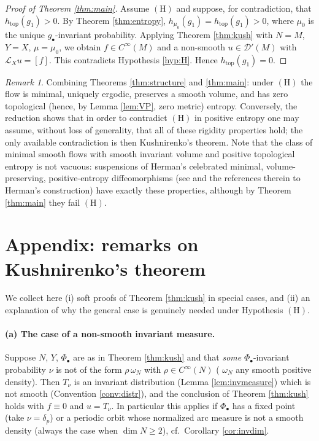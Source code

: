 \documentclass[11pt]{amsart}
\theoremstyle{plain}
\theoremstyle{definition}
\theoremstyle{remark}
\newtheorem{remark}[theorem]{Remark}
\newcommand{\Dp}{\mathcal{D}'}
\newcommand{\Lx}{\mathcal{L}_X}
\begin{document}
\begin{proof}[Proof of Theorem \emph{\ref{thm:main}}]
Assume $(\mathrm{H})$ and suppose, for contradiction, that
$h_{\mathrm{top}}(g_1)>0$. By Theorem \ref{thm:entropy},
$h_{\mu_0}(g_1)=h_{\mathrm{top}}(g_1)>0$, where $\mu_0$ is the unique
$g_\bullet$-invariant probability. Applying Theorem \ref{thm:kush} with
$N=M$, $Y=X$, $\mu=\mu_0$, we obtain $f\in C^\infty(M)$ and a
non-smooth $u\in\Dp(M)$ with $\Lx u=[f]$. This contradicts Hypothesis
\ref{hyp:H}. Hence $h_{\mathrm{top}}(g_1)=0$.
\end{proof}

\begin{remark}
Combining Theorems \ref{thm:structure} and \ref{thm:main}: under
$(\mathrm{H})$ the flow is minimal, uniquely ergodic, preserves a smooth
volume, and has zero topological (hence, by Lemma \ref{lem:VP}, zero
metric) entropy. Conversely, the reduction shows that in order to
contradict $(\mathrm{H})$ in positive entropy one may assume, without
loss of generality, that all of these rigidity properties hold; the only
available contradiction is then Kushnirenko's theorem. Note that the
class of minimal smooth flows with smooth invariant volume and positive
topological entropy is not vacuous: suspensions of Herman's celebrated
minimal, volume-preserving, positive-entropy diffeomorphisms (see
\cite{LWW} and the references therein to Herman's construction) have
exactly these properties, although by Theorem \ref{thm:main} they fail
$(\mathrm{H})$.
\end{remark}

\section{Appendix: remarks on Kushnirenko's theorem}\label{app:kush}

We collect here (i) soft proofs of Theorem \ref{thm:kush} in special
cases, and (ii) an explanation of why the general case is genuinely
needed under Hypothesis $(\mathrm{H})$.

\paragraph{(a) The case of a non-smooth invariant measure.}
Suppose $N$, $Y$, $\Phi_\bullet$ are as in Theorem \ref{thm:kush} and
that \emph{some} $\Phi_\bullet$-invariant probability $\nu$ is not of
the form $\rho\,\omega_N$ with $\rho\in C^\infty(N)$ ( $\omega_N$ any
smooth positive density). Then $T_\nu$ is an invariant distribution
(Lemma \ref{lem:invmeasure}) which is not smooth (Convention
\ref{conv:distr}), and the conclusion of Theorem \ref{thm:kush} holds
with $f\equiv 0$ and $u=T_\nu$. In particular this applies if
$\Phi_\bullet$ has a fixed point (take $\nu=\delta_p$) or a periodic
orbit whose normalized arc measure is not a smooth density (always the
case when $\dim N\ge2$), cf.\ Corollary \ref{cor:invdim}.
\end{document}

